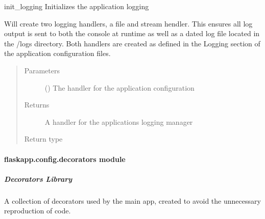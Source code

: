 \documentclass[letterpaper,10pt,english]{sphinxmanual}
\begin{document}
\begin{fulllineitems}
\label{\detokenize{flaskapp.config:flaskapp.config.config_manager.init_logging}}
init\_logging Initializes the application logging

Will create two logging handlers, a file and stream hendler. This ensures all
log output is sent to both the console at runtime as well as a dated log file
located in the /logs directory. Both handlers are created as defined in the
Logging section of the application configuration files.
\begin{quote}\begin{description}
\item[{Parameters}] \leavevmode
{} () \textendash{} The handler for the application configuration

\item[{Returns}] \leavevmode
A handler for the applications logging manager

\item[{Return type}] \leavevmode
{}

\end{description}\end{quote}

\end{fulllineitems}



\paragraph{flaskapp.config.decorators module}
\label{\detokenize{flaskapp.config:module-flaskapp.config.decorators}}\label{\detokenize{flaskapp.config:flaskapp-config-decorators-module}}

\subparagraph{Decorators Library}
\label{\detokenize{flaskapp.config:decorators-library}}
A collection of decorators used by the main
app, created to avoid the unnecessary
reproduction of code.
\end{document}
